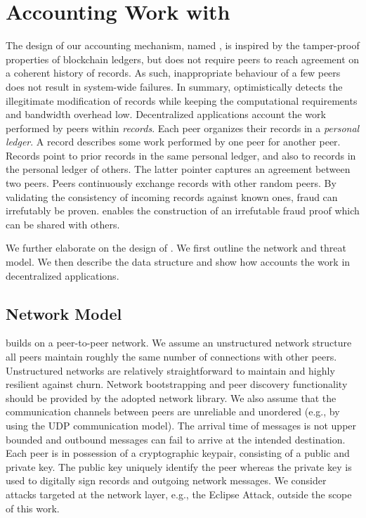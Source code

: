 \section{Accounting Work with \ModelName{}}
\label{sec:micro_accounting}
The design of our accounting mechanism, named \ModelName{}, is inspired by the tamper-proof properties of blockchain ledgers, but does not require peers to reach agreement on a coherent history of records.
As such, inappropriate behaviour of a few peers does not result in system-wide failures.
In summary, \ModelName{} optimistically detects the illegitimate modification of records while keeping the computational requirements and bandwidth overhead low.
Decentralized applications account the work performed by peers within \emph{records}.
Each peer organizes their records in a \emph{personal ledger}.
A record describes some work performed by one peer for another peer.
Records point to prior records in the same personal ledger, and also to records in the personal ledger of others.
The latter pointer captures an agreement between two peers.
Peers continuously exchange records with other random peers.
By validating the consistency of incoming records against known ones, fraud can irrefutably be proven.
\ModelName{} enables the construction of an irrefutable fraud proof which can be shared with others.

We further elaborate on the design of \ModelName{}.
We first outline the network and threat model.
We then describe the \ModelName{} data structure and show how \ModelName{} accounts the work in decentralized applications.

\subsection{Network Model}
\label{sec:network_model}
\ModelName{} builds on a peer-to-peer network.
We assume an unstructured network structure all peers maintain roughly the same number of connections with other peers.
Unstructured networks are relatively straightforward to maintain and highly resilient against churn.
Network bootstrapping and peer discovery functionality should be provided by the adopted network library.
We also assume that the communication channels between peers are unreliable and unordered (e.g., by using the UDP communication model).
The arrival time of messages is not upper bounded and outbound messages can fail to arrive at the intended destination.
Each peer is in possession of a cryptographic keypair, consisting of a public and private key.
The public key uniquely identify the peer whereas the private key is used to digitally sign records and outgoing network messages.
We consider attacks targeted at the network layer, e.g., the Eclipse Attack, outside the scope of this work.

